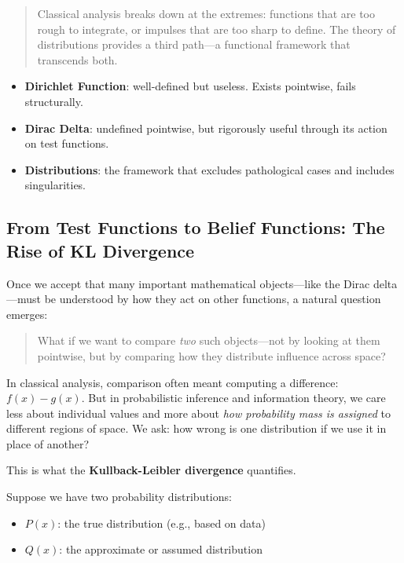 \begin{quote}
Classical analysis breaks down at the extremes: functions that are too rough to integrate, or impulses that are too sharp to define. The theory of distributions provides a third path---a functional framework that transcends both.
\end{quote}

\vspace{1em}
\begin{tcolorbox}[colback=gray!5, colframe=black!60, title={Sidebar: A Tale of Two Extremes}]
\begin{itemize}
    \item \textbf{Dirichlet Function}: well-defined but useless. Exists pointwise, fails structurally.
    \item \textbf{Dirac Delta}: undefined pointwise, but rigorously useful through its action on test functions.
    \item \textbf{Distributions}: the framework that excludes pathological cases and includes singularities.
\end{itemize}
\end{tcolorbox}



\subsection{From Test Functions to Belief Functions: The Rise of KL Divergence}

Once we accept that many important mathematical objects---like the Dirac delta---must be understood by how they act on other functions, a natural question emerges:

\begin{quote}
What if we want to compare \emph{two} such objects---not by looking at them pointwise, but by comparing how they distribute influence across space?
\end{quote}

In classical analysis, comparison often meant computing a difference: \( f(x) - g(x) \). But in probabilistic inference and information theory, we care less about individual values and more about \emph{how probability mass is assigned} to different regions of space. We ask: how wrong is one distribution if we use it in place of another?

This is what the \textbf{Kullback-Leibler divergence} quantifies.

Suppose we have two probability distributions:
\begin{itemize}
    \item \( P(x) \): the true distribution (e.g., based on data)
    \item \( Q(x) \): the approximate or assumed distribution
\end{itemize}

